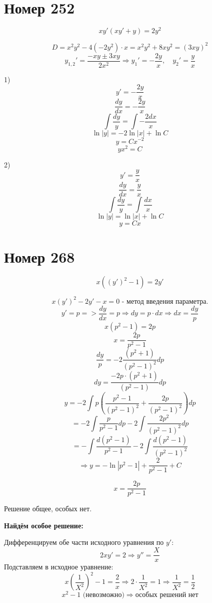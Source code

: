\section*{Номер 252}

$$ xy' (xy' + y) = 2y^2 $$

\begin{solution}
    $$ D = x^2 y^2 - 4(-2y^2) \cdot x = x^2 y^2 + 8xy^2 = (3xy)^2 $$
    $$ y_{1,2}' = \frac{-xy \pm 3xy}{2x^2} \Rightarrow y_1' = -\dfrac{2y}{x}, \quad y_2' = \dfrac{y}{x} $$

    1) $$ y' = -\frac{2y}{x} $$
    $$ \frac{dy}{dx} = -\frac{2y}{x} $$
    $$ \int \frac{dy}{y} = \int -\frac{2dx}{x} $$
    $$ \ln |y| = -2 \ln |x| + \ln C $$
    $$ y = C x^{-2} $$
    $$ yx^2 = C $$

    2) $$ y' = \frac{y}{x} $$
    $$ \frac{dy}{dx} = \frac{y}{x} $$
    $$ \int \frac{dy}{y} = \int \frac{dx}{x} $$
    $$ \ln |y| = \ln |x| + \ln C $$
    $$ y = Cx $$
\end{solution}\pagebreak

\section*{Номер 268}

$$ x ((y')^2 - 1) = 2y' $$

\begin{solution}
    $$ x(y')^2 - 2y' - x = 0 \text{ - метод введения параметра.}$$
    $$ y' = p => \dfrac{dy}{dx} = p \Rightarrow dy = p \cdot dx \Rightarrow dx = \dfrac{dy}{p} $$
    $$ x(p^2 - 1) = 2p $$
    $$ x = \dfrac{2p}{p^2 - 1} $$
    $$ \dfrac{dy}{p} = -2 \dfrac{(p^2 + 1)}{(p^2 - 1)^2} dp $$
    $$ dy = \dfrac{-2p \cdot (p^2 + 1)}{(p^2 - 1)}dp $$
    $$ y = -2 \int p \left( \frac{p^2 - 1}{(p^2 - 1)^2} + \frac{2p}{(p^2 - 1)^2} \right) dp $$
    $$ = -2 \int \frac{p}{p^2 - 1} dp - 2 \int \frac{2p^2}{(p^2 - 1)^2} dp $$
    $$ = - \int \frac{d (p^2 - 1)}{p^2 - 1} - 2 \int \frac{d (p^2 - 1)}{(p^2 - 1)^2} $$
    $$ \Rightarrow y = -\ln |p^2 - 1| + \frac{2}{p^2 - 1} + C $$

    $$ x = \frac{2p}{p^2 - 1} $$

    Решение общее, особых нет.

    \textbf{Найдём особое решение:}

    Дифференцируем обе части исходного уравнения по $y'$:
    $$ 2xy' = 2 \Rightarrow y'' = \frac{X}{x} $$
    Подставляем в исходное уравнение:
    $$ x \left( \frac{1}{X^2} \right)^2 - 1 = \frac{2}{x} \Rightarrow 2 \cdot \frac{1}{X^2} = 1 \Rightarrow \frac{1}{X^2} = \frac{1}{2} $$
    $$ x^2 - 1 \text{ (невозможно)} \Rightarrow \text{особых решений нет} $$
\end{solution}\pagebreak

